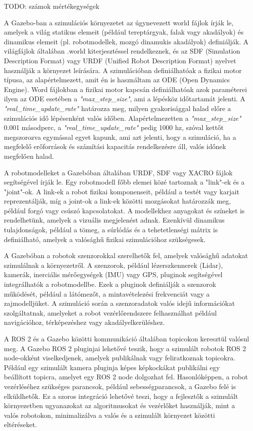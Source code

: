 TODO: számok mértékegységek

A Gazebo-ban a szimulációs környezetet az úgynevezett world fájlok írják le, amelyek a világ statikus elemeit (például tereptárgyak, falak vagy akadályok) és dinamikus elemeit (pl. robotmodellek, mozgó dinamukis akadályok) definiálják. A világfájlok általában .world kiterjesztéssel rendelkeznek, és az SDF (Simulation Description Format) vagy URDF (Unified Robot Description Format) nyelvet használják a környezet leírására. A szimulációban definiálhatóak a fizikai motor típusa, az alapértelmezett, amit én is használtam az ODE (Open Dynamics Engine). Word fájlokban a fizikai motor kapcsán definiálhatóak azok paraméterei ilyen az ODE esetében a \emph{"max\_step\_size"}, ami a lépésköz időtartamát jelenti. A \emph{"real\_time\_update\_rate"} határozza meg, milyen gyakorisággal halad előre a szimulációs idő lépésenként valós időben. Alapértelmezetten a \emph{"max\_step\_size"} 0.001 másodperc, a \emph{"real\_time\_update\_rate"} pedig 1000 hz, szóval kettőt megszorozva egymással egyet kapunk, ami azt jelenti, hogy a szimuláció, ha a megfelelő erőforrások és számítási kapacitás rendelkezésre áll, valós időnek megfelően halad. \cite{gazebo}

A robotmodelleket a Gazebóban általában URDF, SDF vagy XACRO fájlok segítségével írják le. Egy robotmodell főbb elemei közé tartoznak a "link"-ek és a "joint"-ok. A link-ek a robot fizikai komponenseit, például a testét vagy karjait reprezentálják, míg a joint-ok a link-ek közötti mozgásokat határozzák meg, például forgó vagy csúszó kapcsolatokat. A modellekhez anyagokat és színeket is rendelhetünk, amelyek a vizuális megjelenést adnak. Ezenkívül dinamikus tulajdonságok, például a tömeg, a súrlódás és a tehetetlenségi mátrix is definiálható, amelyek a valósághű fizikai szimulációhoz szükségesek. \cite{gazebo}

A Gazebóban a robotok szenzorokkal szerelhetők fel, amelyek valósághű adatokat szimulálnak a környezetről. A szenzorok, például lézerszkennerek (Lidar), kamerák, inerciális mérőegységek (IMU) vagy GPS, pluginok segítségével integrálhatók a robotmodellbe. Ezek a pluginok definiálják a szenzorok működését, például a látómezőt, a mintavételezési frekvenciát vagy a zajmodelljüket. A szimuláció során a szenzoradatok valós idejű információkat szolgáltatnak, amelyeket a robot vezérlőrendszere felhasználhat például navigációhoz, térképezéshez vagy akadályelkerüléshez. \cite{gazebo}

A ROS 2 és a Gazebo közötti kommunikáció általában topicokon keresztül valósul meg. A Gazebo ROS 2 pluginjai lehetővé teszik, hogy a szimulált robotok ROS 2 node-okként viselkedjenek, amelyek publikálnak vagy feliratkoznak topicokra. Például egy szimulált kamera pluginja képes képkockákat publikálni egy beállított topicra, amelyet egy ROS 2 node dolgozhat fel. Hasonlóképpen, a robot vezérléséhez szükséges parancsok, például sebességparancsok, a Gazebo felé is elküldhetők. Ez a szoros integráció lehetővé teszi, hogy a fejlesztők a szimulált környezetben ugyanazokat az algoritmusokat és vezérlőket használják, mint a valós robotokon, minimalizálva a valós és a szimulált környezet közötti eltéréseket. \cite{gazebo}

